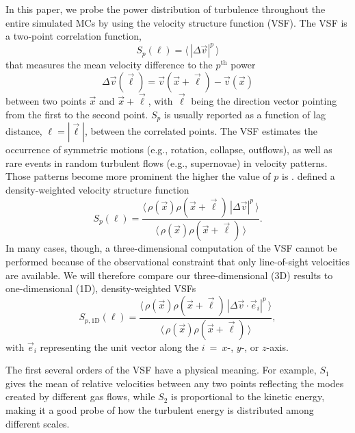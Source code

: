 In this paper, we probe the power distribution of turbulence throughout the entire simulated MCs by using the velocity structure function (VSF).
The VSF is a two-point correlation function,
\begin{equation}
	{S}_p (\ell) = \langle \, |\Delta \vec{v}|^p  \, \rangle
	\label{equ:method:def_vsf}
\end{equation}
that measures the mean velocity difference to the $p^\mathrm{th}$ power
\begin{equation}\Delta \vec{v} (\vec{\ell}) = \vec{v}(\vec{x}+\vec{\ell}) - \vec{v}(\vec{x})
\end{equation} 
between two points $\vec{x}$ and $\vec{x}+\vec{\ell}$, with $\vec{\ell}$ being the direction vector pointing from the first to the second point.  
$S_p$ is usually reported as a function of lag distance, $\ell = |\vec{\ell}|$, between the correlated points.
The VSF estimates the occurrence of symmetric motions (e.g., rotation, collapse, outflows), as well as rare events in random turbulent flows (e.g., supernovae) in velocity patterns.
Those patterns become more prominent the higher the value of $p$ is \citep{Heyer2004}.
\citet{Padoan2016a} defined a density-weighted velocity structure function
\begin{equation}
	{S}_p (\ell) = \frac{\langle \, \rho(\vec{x}) \rho(\vec{x}+\vec{\ell}) \, |\Delta \vec{v}|^p  \, \rangle}{\langle  \, \rho(\vec{x}) \rho(\vec{x}+\vec{\ell}) \, \rangle}.
	\label{equ:method:def_vsf_dw}
\end{equation}
In many cases, though, a three-dimensional computation of the VSF cannot be performed because of the observational constraint that only line-of-sight velocities are available.
We will therefore compare our three-dimensional (3D) results to one-dimensional (1D), density-weighted VSFs
\begin{equation}
	\mathit{S}_{p,\mathrm{1D}} (\ell) = \frac{\langle \, \rho(\vec{x}) \rho(\vec{x}+\vec{\ell}) \, |\Delta 
        \vec{v} \cdot \vec{e}_i|^p  \, \rangle}{\langle  \, \rho(\vec{x}) \rho(\vec{x}+\vec{\ell}) \, \rangle} ,
	\label{equ:method:def_vsf_1d}
\end{equation}
with $\vec{e}_i$ representing the unit vector along the $i$~=~$x$-, $y$-, or $z$-axis.

The first several orders of the VSF have a physical meaning. 
For example, $\mathit{S}_1$ gives the mean of relative velocities between any two points reflecting the modes created by different gas flows, while $\mathit{S}_2$ is proportional to the kinetic energy, making it a good probe of how the turbulent energy is distributed among different scales.

